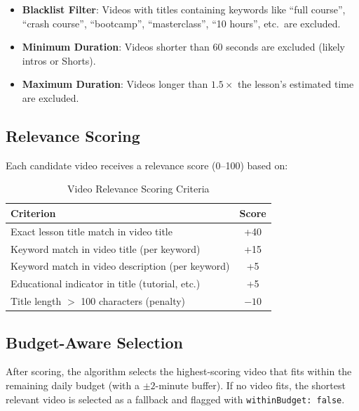 \documentclass[12pt,a4paper]{report}
\begin{document}
\begin{itemize}[noitemsep]
    \item \textbf{Blacklist Filter}: Videos with titles containing keywords like ``full course'', ``crash course'', ``bootcamp'', ``masterclass'', ``10 hours'', etc.\ are excluded.
    \item \textbf{Minimum Duration}: Videos shorter than 60 seconds are excluded (likely intros or Shorts).
    \item \textbf{Maximum Duration}: Videos longer than $1.5\times$ the lesson's estimated time are excluded.
\end{itemize}

\subsection{Relevance Scoring}
Each candidate video receives a relevance score (0--100) based on:

\begin{table}[H]
\centering
\caption{Video Relevance Scoring Criteria}
\label{tab:scoring}
\begin{tabular}{l c}
\toprule
\textbf{Criterion}                             & \textbf{Score} \\
\midrule
Exact lesson title match in video title         & +40 \\
Keyword match in video title (per keyword)      & +15 \\
Keyword match in video description (per keyword)& +5  \\
Educational indicator in title (tutorial, etc.)  & +5  \\
Title length $>$ 100 characters (penalty)        & $-10$ \\
\bottomrule
\end{tabular}
\end{table}

\subsection{Budget-Aware Selection}
After scoring, the algorithm selects the highest-scoring video that fits within the remaining daily budget (with a $\pm 2$-minute buffer). If no video fits, the shortest relevant video is selected as a fallback and flagged with \texttt{withinBudget: false}.
\end{document}
